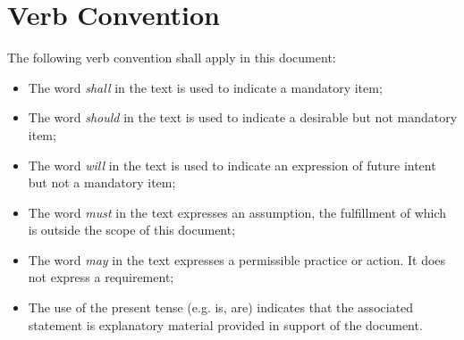 \clearpage
\chapter*{Verb Convention}
\thispagestyle{fancy}

The following verb convention shall apply in this document:
\begin{itemize}
  \item The word \emph{shall} in the text is used to indicate a mandatory item;
  \item The word \emph{should} in the text is used to indicate a desirable but not mandatory item;
  \item The word \emph{will} in the text is used to indicate an expression of future intent but not a mandatory item;
  \item The word \emph{must} in the text expresses an assumption, the fulfillment of which is outside the scope of this document;
  \item The word \emph{may} in the text expresses a permissible practice or action. It does not express a requirement;
  \item The use of the present tense (e.g. is, are) indicates that the associated statement is explanatory material provided in support of the document.
\end{itemize}

